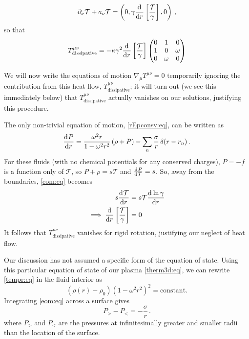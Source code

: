 \documentclass[12pt,a4paper]{article}
\newcommand{\prn}[1]{\left ( #1 \right )}
\newcommand{\brk}[1]{\left [ #1 \right ]}
\newcommand{\diff}[3][\rule{0mm}{0mm}]{\frac{\mathrm{d}^{#1} #2}{\mathrm{d}{#3}^{#1}}}
\newcommand{\p}{\partial}
\newcommand{\rz}{\rho_0}
\newcommand{\tloc}{\mathcal{T}}
\begin{document}
%
\begin{equation}\label{ourheatcond:eq}
  \p_\nu\tloc + a_\nu\tloc = \prn{0, \gamma
  \diff{}{r}\brk{\frac{\tloc}{\gamma}},0}\,,
\end{equation}
%
so that
%
\begin{equation}\label{dissT:eq}
  T^{\mu\nu}_\mathrm{dissipative} =
   -\kappa\gamma^2\diff{}{r}\brk{\frac{\tloc}{\gamma}}
   \begin{pmatrix}
     0 & 1      & 0      \\
     1 & 0      & \omega \\
     0 & \omega & 0      \\
   \end{pmatrix}
\end{equation}
%

We will now write the equations of motion $\nabla_\mu T^{\mu \nu}=0$
temporarily ignoring the contribution from  this heat flow,
$T^{\mu\nu}_\mathrm{dissipative}$; it will turn out (we see this
immediately below) that $T^{\mu\nu}_\mathrm{dissipative}$ actually
vanishes on our solutions, justifying this procedure.

The only non-trivial equation of motion, \eqref{rEpconsv:eq}, can be
written as
%
\begin{equation}\label{eom:eq}
  \diff{P}{r} = \frac{\omega^2r}{1-\omega^2r^2}\,(\rho+P)
              - \sum_n \frac{\sigma}{r}\, \delta(r-r_n)\,.
\end{equation}
%
For these fluids (with no chemical potentials for any conserved
charges), $P=-f$ is a function only of $\tloc$, so $P+\rho = s\tloc$
and $\diff{P}{\tloc} = s$. So, away from the boundaries,
\eqref{eom:eq} becomes
%
\begin{equation}\label{tempr:eq}
\begin{split}
  s \diff{\tloc}{r} &= s \tloc \diff{\ln\gamma}{r} \\ \implies
  \diff{}{r}\brk{\frac{\tloc}{\gamma}} &= 0
\end{split}
\end{equation}
%
It follows that $T^{\mu \nu}_\mathrm{dissipative}$  vanishes for
rigid rotation, justifying our neglect of heat flow.

Our discussion has not assumed a specific form of the equation of
state. Using this particular equation of state of our plasma
\eqref{therm3d:eq}, we can rewrite \eqref{tempr:eq} in the fluid
interior as
%
\begin{equation}\label{eombulk:eq}
  \prn{\rho(r)-\rz}\prn{1-\omega^2r^2}^2 = \text{constant}.
\end{equation}
%
Integrating \eqref{eom:eq} across a surface gives
%
\begin{equation}\label{bcndgen:eq}
  P_>-P_< = -\frac{\sigma}{r}\,.
\end{equation}
%
where $P_>$ and $P_<$ are the pressures at infinitesimally greater
and smaller radii than the location of the surface.
\end{document}
